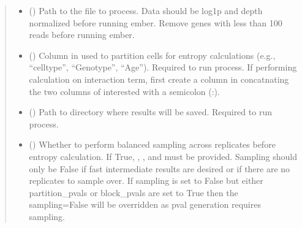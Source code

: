 \documentclass[letterpaper,10pt,english]{sphinxmanual}
\begin{document}
\begin{fulllineitems}
\begin{description}
\begin{itemize}
\end{itemize}

\end{description}
\begin{quote}\begin{description}
\begin{itemize}
\item {} 
\sphinxAtStartPar
{} (\sphinxstyleliteralemphasis{\sphinxupquote{, }}) \textendash{} Path to the  file to process.
Data should be log1p and depth normalized before running ember.
Remove genes with less than 100 reads before running ember.

\item {} 
\sphinxAtStartPar
{} (\sphinxstyleliteralemphasis{\sphinxupquote{, }}) \textendash{} Column in  used to partition cells for entropy calculations
(e.g., “celltype”, “Genotype”, “Age”). Required to run process.
If performing calculation on interaction term, first create a column
in  concatnating the two columns of interested with a semicolon (:).

\item {} 
\sphinxAtStartPar
{} (\sphinxstyleliteralemphasis{\sphinxupquote{, }}) \textendash{} Path to directory where results will be saved. Required to run process.

\item {} 
\sphinxAtStartPar
{} (\sphinxstyleliteralemphasis{\sphinxupquote{, }}) \textendash{} Whether to perform balanced sampling across replicates before entropy calculation.
If True, , , and  must be provided.
Sampling should only be False if fast intermediate results are desired or
if there are no replicates to sample over.
If sampling is set to False but either partition\_pvals or block\_pvals are set to
True then the sampling=False will be overridden as pval generation requires sampling.


\end{itemize}
\end{description}
\end{quote}
\end{fulllineitems}
\end{document}
